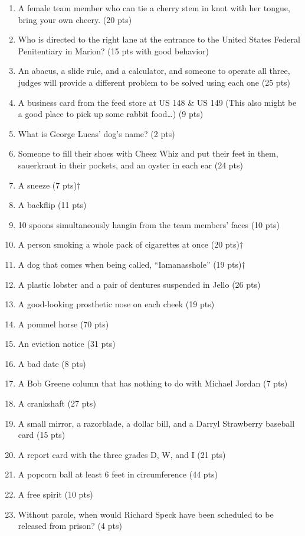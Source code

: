 \begin{enumerate}
\item A female team member who can tie a cherry stem in knot with her tongue, bring your own cheery. (20 pts)
\item Who is directed to the right lane at the entrance to the United States Federal Penitentiary in Marion? (15 pts with good behavior)
\item An abacus, a slide rule, and a calculator, and someone to operate all three, judges will provide a different problem to be solved using each one (25 pts)
\item A business card from the feed store at US 148 \& US 149 (This also might be a good place to pick up some rabbit food{\dots}) (9 pts)
\item What is George Lucas' dog's name? (2 pts)
\item Someone to fill their shoes with Cheez Whiz{\texttrademark} and put their feet in them, sauerkraut in their pockets, and an oyster in each ear (24 pts)
\item A sneeze (7 pts)$\dagger$
\item A backflip (11 pts)
\item 10 spoons simultaneously hangin from the team members' faces (10 pts)
\item A person smoking a whole pack of cigarettes at once (20 pts)$\dagger$
\item A dog that comes when being called, ``Iamanasshole'' (19 pts)$\dagger$
\item A plastic lobster and a pair of dentures suspended in Jello{\texttrademark} (26 pts)
\item A good-looking prosthetic nose on each cheek (19 pts)
\item A pommel horse (70 pts)
\item An eviction notice (31 pts)
\item A bad date (8 pts)
\item A Bob Greene column that  has nothing to do with Michael Jordan (7 pts)
\item A crankshaft (27 pts)
\item A small mirror, a razorblade, a dollar bill, and a Darryl Strawberry baseball card (15 pts)
\item A {\UofC} report card with the three grades D, W, and I (21 pts)
\item A popcorn ball at least 6 feet in circumference (44 pts)
\item A free spirit (10 pts)
\item Without parole, when would Richard Speck have been scheduled to be released from prison? (4 pts)

\end{enumerate}
